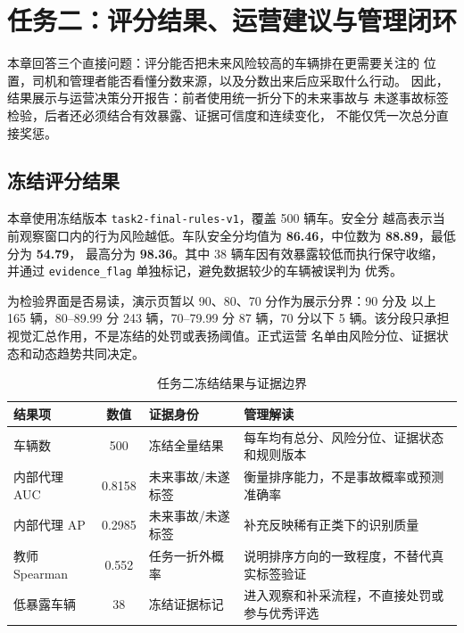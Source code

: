 \section{任务二：评分结果、运营建议与管理闭环}

本章回答三个直接问题：评分能否把未来风险较高的车辆排在更需要关注的
位置，司机和管理者能否看懂分数来源，以及分数出来后应采取什么行动。
因此，结果展示与运营决策分开报告：前者使用统一折分下的未来事故与
未遂事故标签检验，后者还必须结合有效暴露、证据可信度和连续变化，
不能仅凭一次总分直接奖惩。

\subsection{冻结评分结果}

本章使用冻结版本 \texttt{task2-final-rules-v1}，覆盖 500 辆车。安全分
越高表示当前观察窗口内的行为风险越低。车队安全分均值为
\textbf{86.46}，中位数为 \textbf{88.89}，最低分为 \textbf{54.79}，
最高分为 \textbf{98.36}。其中 38 辆车因有效暴露较低而执行保守收缩，
并通过 \texttt{evidence\_flag} 单独标记，避免数据较少的车辆被误判为
优秀。

为检验界面是否易读，演示页暂以 90、80、70 分作为展示分界：90 分及
以上 165 辆，80--89.99 分 243 辆，70--79.99 分 87 辆，70 分以下
5 辆。该分段只承担视觉汇总作用，不是冻结的处罚或表扬阈值。正式运营
名单由风险分位、证据状态和动态趋势共同决定。

\begin{table}[H]
\centering
\caption{任务二冻结结果与证据边界}
\label{tab:t2-frozen-results}
\small
\begin{tabularx}{\textwidth}{lclL}
\toprule
结果项 & 数值 & 证据身份 & 管理解读 \\
\midrule
车辆数 & 500 & 冻结全量结果 & 每车均有总分、风险分位、证据状态和规则版本 \\
内部代理 AUC & 0.8158 & 未来事故/未遂标签 & 衡量排序能力，不是事故概率或预测准确率 \\
内部代理 AP & 0.2985 & 未来事故/未遂标签 & 补充反映稀有正类下的识别质量 \\
教师 Spearman & 0.552 & 任务一折外概率 & 说明排序方向的一致程度，不替代真实标签验证 \\
低暴露车辆 & 38 & 冻结证据标记 & 进入观察和补采流程，不直接处罚或参与优秀评选 \\
\bottomrule
\end{tabularx}
\end{table}

